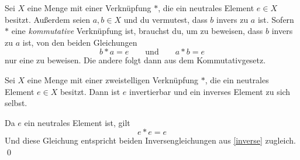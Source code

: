 \begin{bem}
 Sei $X$ eine Menge mit einer Verknüpfung $*$, die ein neutrales Element $e\in X$ besitzt. Außerdem seien $a,b\in X$ und du vermutest, dass $b$ invers zu $a$ ist. Sofern $*$ eine \emph{kommutative} Verknüpfung ist, brauchst du, um zu beweisen, dass $b$ invers zu $a$ ist, von den beiden Gleichungen
 \[ b*a=e\qquad\text{und}\qquad a*b=e \]
 nur eine zu beweisen. Die andere folgt dann aus dem Kommutativgesetz.
\end{bem}





\begin{bem} \label{selbstinvers}
 Sei $X$ eine Menge mit einer zweistelligen Verknüpfung $*$, die ein neutrales Element $e\in X$ besitzt. Dann ist $e$ invertierbar und ein inverses Element zu sich selbst.
\end{bem}
\begin{bew}
 Da $e$ ein neutrales Element ist, gilt
 \[ e*e = e \]
 Und diese Gleichung entspricht beiden Inversengleichungen aus \cref{inverse} zugleich. \qed
\end{bew}




